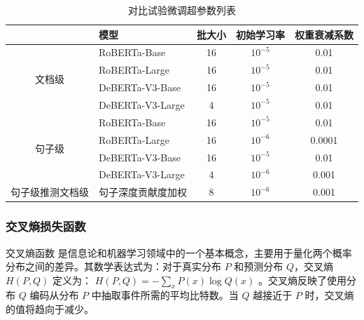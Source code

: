 \begin{table}[htbp]
\centering
\caption{对比试验微调超参数列表}
\label{tab:hyper-parameters}
\begin{tabular}{c|l|ccc}
\toprule
                          & \textbf{模型}   & \textbf{批大小} & \textbf{初始学习率} & \textbf{权重衰减系数} \\ \midrule
\multirow{4}{*}{文档级}    & RoBERTa-Base \cite{liu_roberta_2019}     & 16                  & $10^{-5}$                & 0.01                  \\
                          & RoBERTa-Large \cite{liu_roberta_2019}    & 16                  & $10^{-5}$                & 0.01                  \\
                          & DeBERTa-V3-Base \cite{he2023debertav3improvingdebertausing}  & 16                  & $10^{-5}$                & 0.01                  \\
                          & DeBERTa-V3-Large \cite{he2023debertav3improvingdebertausing} & 4                   & $10^{-5}$                & 0.01                  \\ \midrule
\multirow{4}{*}{句子级}    & RoBERTa-Base \cite{liu_roberta_2019}     & 16                  & $10^{-5}$                & 0.01                  \\
                          & RoBERTa-Large \cite{liu_roberta_2019}    & 16                  & $10^{-6}$               & 0.0001                \\
                          & DeBERTa-V3-Base \cite{he2023debertav3improvingdebertausing}  & 16                  & $10^{-5}$                & 0.01                  \\
                          & DeBERTa-V3-Large \cite{he2023debertav3improvingdebertausing} & 4                   & $10^{-6}$               & 0.001                 \\ \midrule
句子级推测文档级 & 句子深度贡献度加权 & 8 & $10^{-6}$ & 0.001 \\ \bottomrule
\end{tabular}
\end{table}

\subsubsection{交叉熵损失函数}

交叉熵函数 \cite{CrossEntropy} 是信息论和机器学习领域中的一个基本概念，主要用于量化两个概率分布之间的差异。其数学表达式为：对于真实分布 \( P \) 和预测分布 \( Q \)，交叉熵 \( H(P, Q) \) 定义为：
\(
H(P, Q) = -\sum_x P(x) \log Q(x)
\)
。交叉熵反映了使用分布 \( Q \) 编码从分布 \( P \) 中抽取事件所需的平均比特数。当 \( Q \) 越接近于 \( P \) 时，交叉熵的值将趋向于减少。

